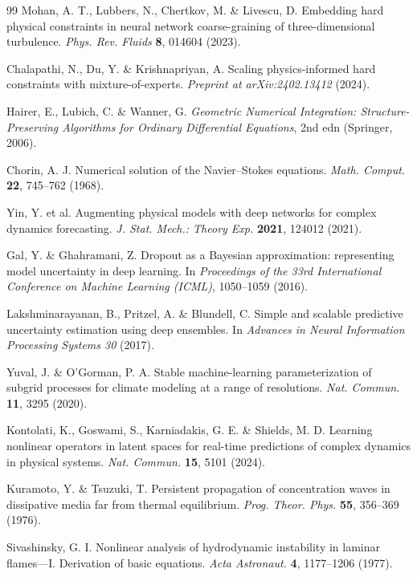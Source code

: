 \documentclass[11pt,a4paper]{article}
\begin{document}
\begin{thebibliography}{99}
 Mohan, A. T., Lubbers, N., Chertkov, M. \& Livescu, D. Embedding hard physical constraints in neural network coarse-graining of three-dimensional turbulence. \emph{Phys. Rev. Fluids} \textbf{8}, 014604 (2023).

 Chalapathi, N., Du, Y. \& Krishnapriyan, A. Scaling physics-informed hard constraints with mixture-of-experts. \emph{Preprint at arXiv:2402.13412} (2024).

 Hairer, E., Lubich, C. \& Wanner, G. \emph{Geometric Numerical Integration: Structure-Preserving Algorithms for Ordinary Differential Equations}, 2nd edn (Springer, 2006).

 Chorin, A. J. Numerical solution of the Navier--Stokes equations. \emph{Math. Comput.} \textbf{22}, 745--762 (1968).

 Yin, Y. et al. Augmenting physical models with deep networks for complex dynamics forecasting. \emph{J. Stat. Mech.: Theory Exp.} \textbf{2021}, 124012 (2021).

 Gal, Y. \& Ghahramani, Z. Dropout as a Bayesian approximation: representing model uncertainty in deep learning. In \emph{Proceedings of the 33rd International Conference on Machine Learning (ICML)}, 1050--1059 (2016).

 Lakshminarayanan, B., Pritzel, A. \& Blundell, C. Simple and scalable predictive uncertainty estimation using deep ensembles. In \emph{Advances in Neural Information Processing Systems 30} (2017).

 Yuval, J. \& O'Gorman, P. A. Stable machine-learning parameterization of subgrid processes for climate modeling at a range of resolutions. \emph{Nat. Commun.} \textbf{11}, 3295 (2020).

 Kontolati, K., Goswami, S., Karniadakis, G. E. \& Shields, M. D. Learning nonlinear operators in latent spaces for real-time predictions of complex dynamics in physical systems. \emph{Nat. Commun.} \textbf{15}, 5101 (2024).

 Kuramoto, Y. \& Tsuzuki, T. Persistent propagation of concentration waves in dissipative media far from thermal equilibrium. \emph{Prog. Theor. Phys.} \textbf{55}, 356--369 (1976).

 Sivashinsky, G. I. Nonlinear analysis of hydrodynamic instability in laminar flames---I. Derivation of basic equations. \emph{Acta Astronaut.} \textbf{4}, 1177--1206 (1977).


\end{thebibliography}
\end{document}
